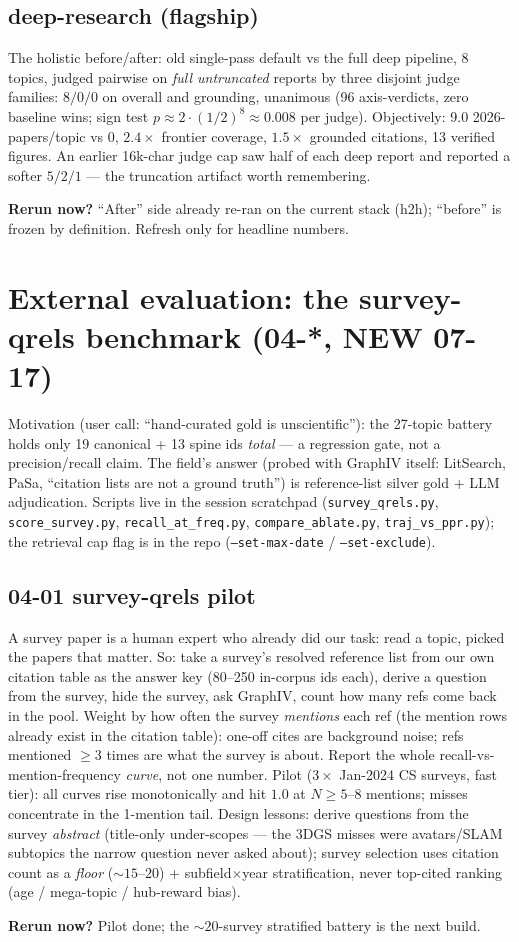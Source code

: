 \documentclass[10pt]{article}
\newcommand{\rerun}[1]{\par\smallskip\noindent\textbf{Rerun now?} #1}
\begin{document}
\subsection*{deep-research (flagship)}
The holistic before/after: old single-pass default vs the full deep pipeline, 8 topics, judged
pairwise on \emph{full untruncated} reports by three disjoint judge families: $8/0/0$ on
overall and grounding, unanimous (96 axis-verdicts, zero baseline wins; sign test
$p \approx 2\cdot(1/2)^{8} \approx 0.008$ per judge). Objectively: 9.0 2026-papers/topic vs 0,
$2.4\times$ frontier coverage, $1.5\times$ grounded citations, 13 verified figures. An earlier
16k-char judge cap saw half of each deep report and reported a softer $5/2/1$ --- the
truncation artifact worth remembering.
\rerun{``After'' side already re-ran on the current stack (h2h); ``before'' is frozen by
definition. Refresh only for headline numbers.}

\section{External evaluation: the survey-qrels benchmark (04-*, NEW 07-17)}

\noindent Motivation (user call: ``hand-curated gold is unscientific''): the 27-topic battery
holds only 19 canonical + 13 spine ids \emph{total} --- a regression gate, not a
precision/recall claim. The field's answer (probed with GraphIV itself: LitSearch, PaSa,
``citation lists are not a ground truth'') is reference-list silver gold + LLM adjudication.
Scripts live in the session scratchpad (\texttt{survey\_qrels.py}, \texttt{score\_survey.py},
\texttt{recall\_at\_freq.py}, \texttt{compare\_ablate.py}, \texttt{traj\_vs\_ppr.py}); the
retrieval cap flag is in the repo (\texttt{--set-max-date} / \texttt{--set-exclude}).

\subsection*{04-01 survey-qrels pilot}
A survey paper is a human expert who already did our task: read a topic, picked the papers
that matter. So: take a survey's resolved reference list from our own citation table as the
answer key (80--250 in-corpus ids each), derive a question from the survey, hide the survey,
ask GraphIV, count how many refs come back in the pool. Weight by how often the survey
\emph{mentions} each ref (the mention rows already exist in the citation table): one-off cites
are background noise; refs mentioned $\geq 3$ times are what the survey is about. Report the
whole recall-vs-mention-frequency \emph{curve}, not one number. Pilot ($3\times$ Jan-2024 CS
surveys, fast tier): all curves rise monotonically and hit $1.0$ at $N \geq 5$--$8$ mentions;
misses concentrate in the 1-mention tail. Design lessons: derive questions from the survey
\emph{abstract} (title-only under-scopes --- the 3DGS misses were avatars/SLAM subtopics the
narrow question never asked about); survey selection uses citation count as a \emph{floor}
(${\sim}15$--$20$) + subfield$\times$year stratification, never top-cited ranking
(age / mega-topic / hub-reward bias).
\rerun{Pilot done; the ${\sim}20$-survey stratified battery is the next build.}
\end{document}
